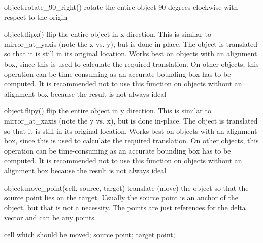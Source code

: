 \begin{APIfunc}{object.rotate\_90\_right()}
    rotate the entire object 90 degrees clockwise with respect to the origin
    \begin{APIparameters}
    \end{APIparameters}
\end{APIfunc}
\begin{APIfunc}{object.flipx()}
    flip the entire object in x direction. This is similar to mirror\_at\_yaxis (note the x vs. y), but is done in-place. The object is translated so that it is still in its original location. Works best on objects with an alignment box, since this is used to calculate the required translation. On other objects, this operation can be time-consuming as an accurate bounding box has to be computed. It is recommended not to use this function on objects without an alignment box because the result is not always ideal
    \begin{APIparameters}
    \end{APIparameters}
\end{APIfunc}
\begin{APIfunc}{object.flipy()}
    flip the entire object in y direction. This is similar to mirror\_at\_xaxis (note the y vs. x), but is done in-place. The object is translated so that it is still in its original location. Works best on objects with an alignment box, since this is used to calculate the required translation. On other objects, this operation can be time-consuming as an accurate bounding box has to be computed. It is recommended not to use this function on objects without an alignment box because the result is not always ideal
    \begin{APIparameters}
    \end{APIparameters}
\end{APIfunc}
\begin{APIfunc}{object.move\_point(cell, source, target)}
    translate (move) the object so that the source point lies on the target. Usually the source point is an anchor of the object, but that is not a necessity. The points are just references for the delta vector and can be any points.
    \begin{APIparameters}
            cell which should be moved;
            source point;
            target point;
    \end{APIparameters}
\end{APIfunc}
